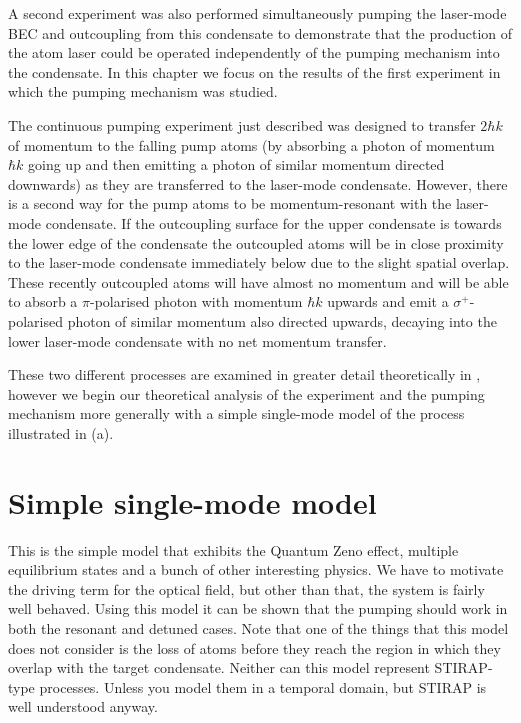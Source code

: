 A second experiment was also performed simultaneously pumping the laser-mode BEC and outcoupling from this condensate to demonstrate that the production of the atom laser could be operated independently of the pumping mechanism into the condensate.  In this chapter we focus on the results of the first experiment in which the pumping mechanism was studied.

\parasep

The continuous pumping experiment just described was designed to transfer $2 \hbar k$ of momentum to the falling pump atoms (by absorbing a photon of momentum $\hbar k$ going up and then emitting a photon of similar momentum directed downwards) as they are transferred to the laser-mode condensate.  However, there is a second way for the pump atoms to be momentum-resonant with the laser-mode condensate.  If the outcoupling surface for the upper condensate is towards the lower edge of the condensate the outcoupled atoms will be in close proximity to the laser-mode condensate immediately below due to the slight spatial overlap.  These recently outcoupled atoms will have almost no momentum and will be able to absorb a $\pi$-polarised photon with momentum $\hbar k$ upwards and emit a $\sigma^+$-polarised photon of similar momentum also directed upwards, decaying into the lower laser-mode condensate with no net momentum transfer.

These two different processes are examined in greater detail theoretically in , however we begin our theoretical analysis of the experiment and the pumping mechanism more generally with a simple single-mode model of the process illustrated in (a).


\section{Simple single-mode model}
\label{OpticalPumping:SingleModeModel}

This is the simple model that exhibits the Quantum Zeno effect, multiple equilibrium states and a bunch of other interesting physics.  We have to motivate the driving term for the optical field, but other than that, the system is fairly well behaved.  Using this model it can be shown that the pumping should work in both the resonant and detuned cases.  Note that one of the things that this model does not consider is the loss of atoms before they reach the region in which they overlap with the target condensate. Neither can this model represent STIRAP-type processes. Unless you model them in a temporal domain, but STIRAP is well understood anyway.

